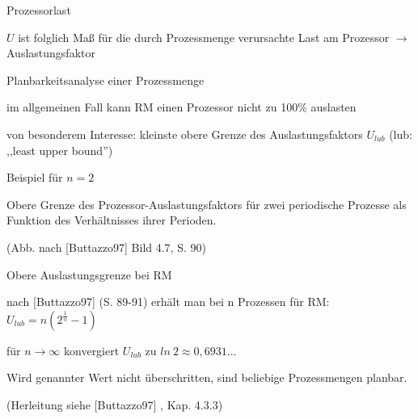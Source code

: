 \documentclass[a4paper]{article}
\begin{document}
\begin{multicols}{3}
\begin{itemize*}
\begin{itemize*}
        \end{itemize*}
        \item
        Prozessorlast
        \begin{itemize*}
            \item $U$ ist folglich Maß für die durch Prozessmenge verursachte Last am Prozessor $\rightarrow$ Auslastungsfaktor
        \end{itemize*}
        \item
        Planbarkeitsanalyse einer Prozessmenge
        \begin{itemize*}
            \item im allgemeinen Fall kann RM einen Prozessor nicht zu 100\% auslasten
            \item von besonderem Interesse: kleinste obere Grenze des Auslastungsfaktors $U_{lub}$ (lub: ,,least upper bound'')
        \end{itemize*}
        \item
        Beispiel für $n=2$
        \begin{itemize*}
            \item Obere Grenze des Prozessor-Auslastungsfaktors für zwei periodische Prozesse als Funktion des Verhältnisses ihrer Perioden.
            \item (Abb. nach [Buttazzo97] Bild 4.7, S. 90)
        \end{itemize*}
        \item
        Obere Auslastungsgrenze bei RM
        \begin{itemize*}
            \item nach [Buttazzo97] (S. 89-91) erhält man bei n Prozessen für RM: $U_{lub}=n(2^{\frac{1}{n}}-1)$
            \item für $n\rightarrow\infty$ konvergiert $U_{lub}$ zu $ln\ 2 \approx 0,6931...$
            \item Wird genannter Wert nicht überschritten, sind beliebige Prozessmengen planbar.
            \item (Herleitung siehe [Buttazzo97] , Kap. 4.3.3)
        \end{itemize*}
    \end{itemize*}



\end{multicols}
\end{document}
